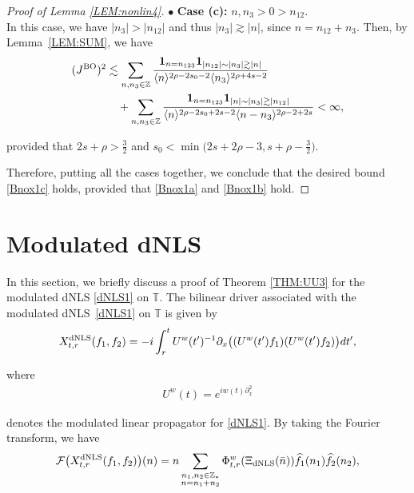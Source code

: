 \documentclass[letterpaper, 11pt,  reqno]{amsart}
\newcommand{\1}{\hspace{0.5mm}\text{I}\hspace{0.5mm}}
\newcommand{\noi}{\noindent}
\newcommand{\Z}{\mathbb{Z}}
\newcommand{\T}{\mathbb{T}}
\newcommand{\bul}{\bullet}
\newcommand{\F}{\mathcal{F}}
\newcommand{\ft}{\widehat}
\newcommand{\dx}{\partial_x}
\newcommand{\les}{\lesssim}
\newcommand{\ges}{\gtrsim}
\newcommand{\jb}[1]
{\langle #1 \rangle}
\newcommand{\ind}{\mathbf 1}
\newcommand{\uw}{U^w}
\newcommand{\sub}{\substack}
\newcommand{\BO}{\text{\rm BO} }
\newcommand{\dNLS}{\text{\rm dNLS} }
\numberwithin{equation}{section}
\numberwithin{theorem}{section}
\begin{document}
\begin{proof}[Proof of Lemma \ref{LEM:nonlin4}]
\noi
$\bul$ {\bf Case (c):} $n, n_3>0>n_{12}$.\\
\indent
In this case, we have $|n_{3}| > |n_{12}|$ and thus $|n_{3}| \ges |n|$,
since $n = n_{12} + n_3$.
Then, by Lemma~\ref{LEM:SUM},  we have
\begin{align*}
( J^\BO)^2
& \les  \sum_{n,  n_3 \in \Z}
\frac{\ind_{n = n_{123}}\ind_{|n_{12}|\sim |n_3| \ges |n|}}
{\jb{n}^{2\rho-2s_0 - 2}
\jb{n_3}^{2\rho + 4s-2}} \\
& 
\quad +   \sum_{n,  n_3 \in \Z}
\frac{\ind_{n = n_{123}}\ind_{|n|\sim |n_3| \ges |n_{12}|}}
{\jb{n}^{2\rho-2s_0 +2s - 2}
\jb{n - n_3}^{2\rho-2+2s}} < \infty, 
\end{align*}


\noi
provided that 
$2s + \rho  > \frac 32$ and $s_0 < \min\big(2s + 2\rho -3, s + \rho - \frac 32\big)$.




\medskip

Therefore, 
putting all the cases together, 
we conclude that  the desired bound \eqref{Bnox1c} holds, 
provided that \eqref{Bnox1a}
and \eqref{Bnox1b}
hold.
\end{proof}






\section{Modulated dNLS}
\label{SEC:NLS}


In this section, we briefly discuss a proof of Theorem \ref{THM:UU3}
for the modulated dNLS \eqref{dNLS1} on $\T$.
The bilinear driver associated with 
the modulated dNLS~\eqref{dNLS1} on $\T$ is given by 
\begin{align}
X^\dNLS_{t,r}( f _1, f _2)
=-i \int_r^t  \uw  (t')^{-1}
\dx \big( (\uw (t')   f _1)( \uw (t')  f_2)\big) dt',
\label{SX1}
\end{align}


\noi
where 
\begin{align*}
\uw (t)=e^{i w(t) \dx^2 }
\end{align*}

\noi
denotes 
the modulated linear propagator
for \eqref{dNLS1}.
By taking the Fourier transform, we have 
\begin{align*}
\F\big( X^\dNLS_{t,r}  ( f _1, f _2) \big)(n)  =
n  \sum_{ \sub {n_1, n_2 \in \Z_*\\ n = n_1+n_2}}
 \Phi_{t,r}^{w}(\Xi_\dNLS (\bar n))\ft  f_1 ( n_1 )  \ft   f_2 (n_2), 
\end{align*}
\end{document}
